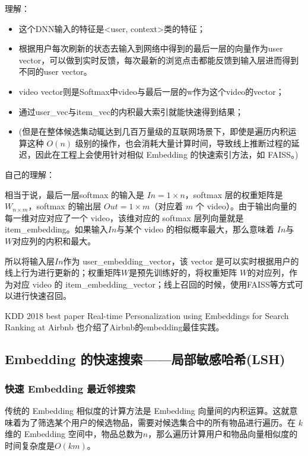 \documentclass[12pt]{article}
\begin{document}
\begin{framed}
理解：

\begin{itemize}
\setlength{\itemsep}{0pt}
\setlength{\parsep}{0pt}
\setlength{\parskip}{0pt}
    \item 这个DNN输入的特征是<user, context>类的特征；
    \item 根据用户每次刷新的状态去输入到网络中得到的最后一层的向量作为user vector，可以做到实时反馈，每次最新的浏览点击都能反馈到输入层进而得到不同的user vector。
    \item video vector则是Softmax中video与最后一层的w作为这个video的vector；
    \item 通过user\_vec与item\_vec的内积最大索引就能快速得到结果；
    \item (但是在整体候选集动辄达到几百万量级的互联网场景下，即使是遍历内积运算这种 $O(n)$ 级别的操作，也会消耗大量计算时间，导致线上推断过程的延迟，因此在工程上会使用针对相似 Embedding 的快速索引方法，如 FAISS。)
\end{itemize}

自己的理解：

相当于说，最后一层softmax 的输入是 $In = 1 \times n$，softmax 层的权重矩阵是$W_{n\times m}$，softmax 的输出层 $Out = 1 \times m$（对应着 $m$ 个 video）。由于输出向量的每一维对应对应了一个 video，该维对应的 softmax 层列向量就是 item\_embedding。如果输入$In$与某个 video 的相似概率最大，那么意味着 $In$与 $W$对应列的内积和最大。

所以将输入层$In$作为 user\_embedding\_vector，该 vector 是可以实时根据用户的线上行为进行更新的；权重矩阵$W$是预先训练好的，将权重矩阵 $W$的对应列，作为对应 video 的 item\_embedding\_vector；线上召回的时候，使用FAISS等方式可以进行快速召回。
\end{framed}

KDD 2018 best paper Real-time Personalization using Embeddings for Search Ranking at Airbnb 也介绍了Airbnb的embedding最佳实践。

\subsection{Embedding 的快速搜索——局部敏感哈希(LSH)}
\subsubsection{快速 Embedding 最近邻搜索}
传统的 Embedding 相似度的计算方法是 Embedding 向量间的内积运算。这就意味着为了筛选某个用户的候选物品，需要对候选集合中的所有物品进行遍历。在 $k$ 维的 Embedding 空间中，物品总数为$n$，那么遍历计算用户和物品向量相似度的时间复杂度是$O(km)$。
\end{document}
